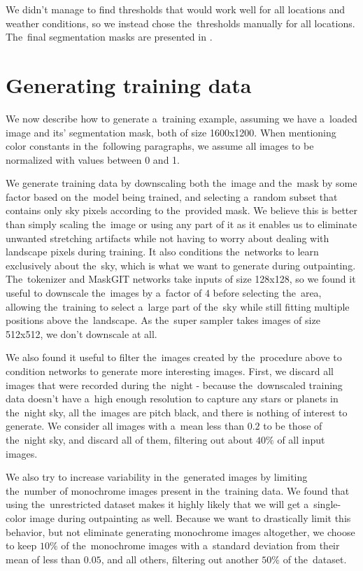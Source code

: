 We didn't manage to find thresholds that would work well for all locations and weather conditions, so we instead chose the~thresholds manually for all locations. The~final segmentation masks are presented in .



\section{Generating training data}

We now describe how to generate a~training example, assuming we have a~loaded image and its' segmentation mask, both of size 1600x1200. When mentioning color constants in the~following paragraphs, we assume all images to be normalized with values between 0 and 1.

We generate training data by downscaling both the~image and the~mask by some factor based on the~model being trained, and selecting a~random subset that contains only sky pixels according to the~provided mask. We believe this is better than simply scaling the~image or using any part of it as it enables us to eliminate unwanted stretching artifacts while not having to worry about dealing with landscape pixels during training. It also conditions the~networks to learn exclusively about the~sky, which is what we want to generate during outpainting. The~tokenizer and MaskGIT networks take inputs of size 128x128, so we found it useful to downscale the~images by a~factor of 4 before selecting the~area, allowing the~training to select a~large part of the~sky while still fitting multiple positions above the~landscape. As the~super sampler takes images of size 512x512, we don't downscale at all.

We also found it useful to filter the~images created by the~procedure above to condition networks to generate more interesting images. First, we discard all images that were recorded during the~night - because the~downscaled training data doesn't have a~high enough resolution to capture any stars or planets in the~night sky, all the~images are pitch black, and there is nothing of interest to generate. We consider all images with a~mean less than $0.2$ to be those of the~night sky, and discard all of them, filtering out about $40\%$ of all input images.

We also try to increase variability in the~generated images by limiting the~number of monochrome images present in the~training data. We found that using the~unrestricted dataset makes it highly likely that we will get a~single-color image during outpainting as well. Because we want to drastically limit this behavior, but not eliminate generating monochrome images altogether, we choose to keep $10\%$ of the~monochrome images with a~standard deviation from their mean of less than $0.05$, and all others, filtering out another $50\%$ of the~dataset. 

